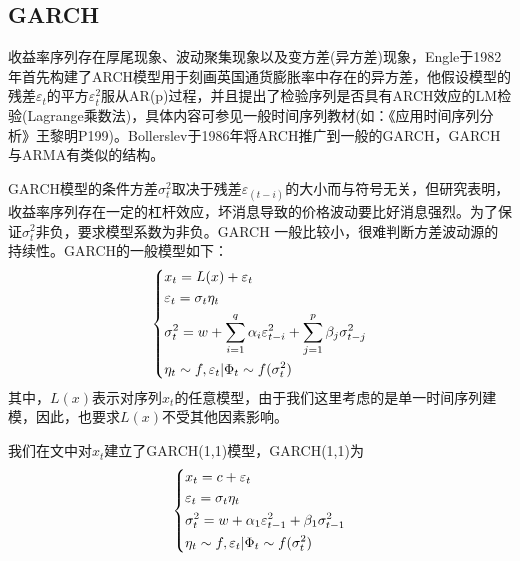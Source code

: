     \subsection{GARCH}
        收益率序列存在厚尾现象、波动聚集现象以及变方差(异方差)现象，Engle于1982年首先构建了ARCH模型用于刻画英国通货膨胀率中存在的异方差，他假设模型的残差$\varepsilon_t$的平方$\varepsilon_t^2$服从AR(p)过程，并且提出了检验序列是否具有ARCH效应的LM检验(Lagrange乘数法)，具体内容可参见一般时间序列教材(如：《应用时间序列分析》王黎明P199)。Bollerslev于1986年将ARCH推广到一般的GARCH，GARCH与ARMA有类似的结构。
        \par
        GARCH模型的条件方差$\sigma_t^2$取决于残差$\varepsilon _{(t-i)}$的大小而与符号无关，但研究表明，收益率序列存在一定的杠杆效应，坏消息导致的价格波动要比好消息强烈。为了保证$\sigma_t^2$非负，要求模型系数为非负。GARCH 一般比较小，很难判断方差波动源的持续性。GARCH的一般模型如下：
        \begin{equation*}
        \centering
        \left\{\begin{lgathered}
        {x_t} = L(x) + {\varepsilon _t}\\
        {\varepsilon _t} = {\sigma _t}{\eta _t}\\
        \sigma _t^2 = w + \sum\limits_{i = 1}^q {{\alpha _i}\varepsilon _{t - i}^2}  + \sum\limits_{j = 1}^p {{\beta _j}\sigma _{t - j}^2} \\
        {\eta _t} \sim f,{\varepsilon _t}|{\Phi _t} \sim f(\sigma _t^2)
        \end{lgathered} \right.
        \end{equation*}
        其中，$L(x)$表示对序列$x_t$的任意模型，由于我们这里考虑的是单一时间序列建模，因此，也要求$L(x)$不受其他因素影响。
        \par
        我们在文中对$x_t$建立了GARCH(1,1)模型，GARCH(1,1)为
        \begin{equation*}
        \centering
        \left\{\begin{lgathered}
        {x_t} = c + {\varepsilon _t}\\
        {\varepsilon _t} = {\sigma _t}{\eta _t}\\
        \sigma _t^2 = w + {\alpha _1}\varepsilon _{t - 1}^2 + {\beta _1}\sigma _{t - 1}^2\\
        {\eta _t} \sim f,{\varepsilon _t}|{\Phi _t} \sim f(\sigma _t^2)
        \end{lgathered} \right.
        \end{equation*}
